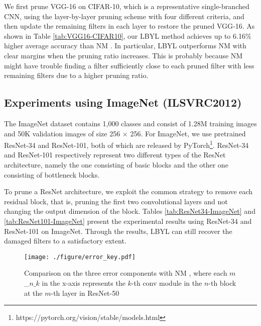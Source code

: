We first prune VGG-16 on CIFAR-10, which is a representative single-branched CNN, using the layer-by-layer pruning scheme with four different criteria, and then update the remaining filters in each layer to restore the pruned VGG-16. As shown in Table \ref{tab:VGG16-CIFAR10}, our LBYL method achieves up to 6.16\% higher average accuracy than NM \cite{NM}. In particular, LBYL outperforms NM with clear margins when the pruning ratio increases. This is probably because NM might have trouble finding a filter sufficiently close to each pruned filter with less remaining filters due to a higher pruning ratio.

\subsection{Experiments using ImageNet (ILSVRC2012)}

The ImageNet dataset \cite{deng2009imagenet} contains 1,000 classes and consist of 1.28M training images and 50K validation images of size 256 $\times$ 256. For ImageNet, we use pretrained ResNet-34 and ResNet-101, both of which are released by PyTorch\footnote{https://pytorch.org/vision/stable/models.html}. ResNet-34 and ResNet-101 respectively represent two different types of the ResNet architecture, namely the one consisting of basic blocks and the other one consisting of bottleneck blocks.

To prune a ResNet architecture, we exploit the common strategy to remove each residual block, that is, pruning the first two convolutional layers and not changing the output dimension of the block. Tables \ref{tab:ResNet34-ImageNet} and \ref{tab:ResNet101-ImageNet} present the experimental results using ResNet-34 and ResNet-101 on ImageNet. Through the results, LBYL can still recover the damaged filters to a satisfactory extent.

\begin{figure}[t]
	\centering 
	\texttt{[image: ./figure/error\_key.pdf]} \\
    \caption{Comparison on the three error components with NM \cite{NM}, where each $m$\_$n\_k$ in the x-axis represents the $k$-th conv module in the $n$-th block at the $m$-th layer in ResNet-50}
	\label{fig:error_components}
	\vspace{-2mm}
\end{figure}


